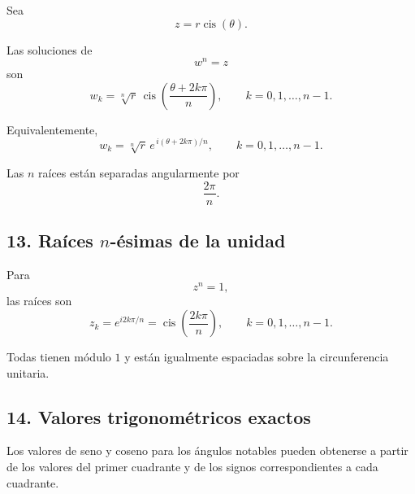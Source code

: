 \documentclass[12pt]{article}
\begin{document}
Sea
\[
z=r\operatorname{cis}(\theta).
\]

Las soluciones de
\[
w^n=z
\]
son
\[
\boxed{
w_k
=
\sqrt[n]{r}\,
\operatorname{cis}
\left(
\frac{\theta+2k\pi}{n}
\right),
\qquad
k=0,1,\ldots,n-1.
}
\]

Equivalentemente,
\[
\boxed{
w_k
=
\sqrt[n]{r}\,
e^{\,i(\theta+2k\pi)/n},
\qquad
k=0,1,\ldots,n-1.
}
\]

Las $n$ raíces están separadas angularmente por
\[
\boxed{\frac{2\pi}{n}}.
\]

\subsection*{13. Raíces $n$-ésimas de la unidad}

Para
\[
z^n=1,
\]
las raíces son
\[
\boxed{
z_k
=
e^{i2k\pi/n}
=
\operatorname{cis}\left(\frac{2k\pi}{n}\right),
\qquad
k=0,1,\ldots,n-1.
}
\]

Todas tienen módulo $1$ y están igualmente espaciadas sobre
la circunferencia unitaria.

\subsection*{14. Valores trigonométricos exactos}

Los valores de seno y coseno para los ángulos notables pueden
obtenerse a partir de los valores del primer cuadrante y de los
signos correspondientes a cada cuadrante.

\medskip
\end{document}
